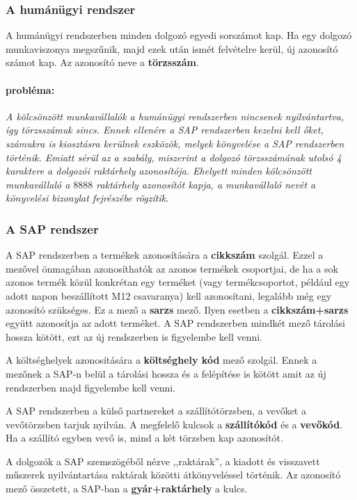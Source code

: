 \documentclass[a4paper,12pt]{report}
\begin{document}
\subsubsection{A humánügyi rendszer}
A humánügyi rendszerben minden dolgozó egyedi sorszámot kap. Ha egy dolgozó 
munkaviszonya megszűnik, majd ezek után ismét felvételre kerül, új azonosító 
számot kap. Az azonosító neve a \textbf{törzsszám}.
\paragraph*{probléma:}
\textit{ 
A kölcsönzött munkavállalók a humánügyi rendszerben nincsenek nyilvántartva, 
így törzsszámuk sincs. Ennek ellenére a SAP rendszerben kezelni kell őket, 
számukra is kiosztásra kerülnek eszközök, melyek könyvelése a SAP rendszerben 
történik. Emiatt sérül az a szabály, miszerint a dolgozó törzsszámának utolsó 4 
karaktere a dolgozói raktárhely azonosítója. Ehelyett minden kölcsönzött 
munkavállaló a $8888$ raktárhely azonosítót kapja, a munkavállaló nevét a 
könyvelési bizonylat fejrészébe rögzítik.
}

\subsubsection{A SAP rendszer}
A SAP rendszerben a termékek azonosítására a \textbf{cikkszám} szolgál. Ezzel a
mezővel önmagában azonosíthatók az azonos termékek csoportjai, de ha a sok 
azonos termék közül konkrétan egy terméket (vagy termékcsoportot, például egy 
adott napon beszállított M12 csavaranya) kell 
azonosítani, legalább még egy azonosító szükséges. Ez a mező a \textbf{sarzs} 
mező. Ilyen esetben a \textbf{cikkszám+sarzs} együtt azonosítja az adott 
terméket. A SAP rendszerben mindkét mező tárolási hossza kötött, ezt az új 
rendszerben is figyelembe kell venni.


A költséghelyek azonosítására a \textbf{költséghely kód} mező szolgál. Ennek a 
mezőnek a SAP-n belül a tárolási hossza és a felépítése is kötött amit az új 
rendszerben majd figyelembe kell venni.

A SAP rendszerben a külső partnereket a szállítótörzsben, a vevőket a 
vevőtörzsben tarjuk nyilván. A megfelelő kulcsok a \textbf{szállítókód} és a 
\textbf{vevőkód}. Ha a szállító egyben vevő is, mind a két törzsben kap 
azonosítót.

A dolgozók a SAP szemszögéből nézve ,,raktárak'', a kiadott és 
visszavett műszerek nyilvántartása raktárak közötti átkönyveléssel történik. Az 
azonosító mező összetett, a SAP-ban a \textbf{gyár+raktárhely} a kulcs.
\end{document}
